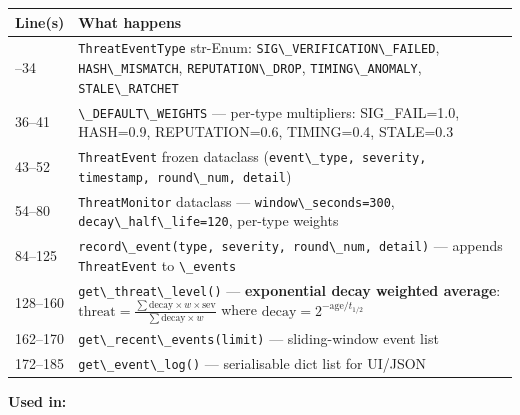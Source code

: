 \documentclass[11pt,a4paper]{article}
\newcommand{\code}[1]{\lstinline[basicstyle=\ttfamily\small]!#1!}
\begin{document}
\begin{longtable}{L{2.2cm} L{11.5cm}}
\toprule
\textbf{Line(s)} & \textbf{What happens} \\
\midrule
\endhead
\bottomrule
{}--34  & \code{ThreatEventType} str-Enum: \code{SIG\_VERIFICATION\_FAILED}, \code{HASH\_MISMATCH}, \code{REPUTATION\_DROP}, \code{TIMING\_ANOMALY}, \code{STALE\_RATCHET} \\
36--41  & \code{\_DEFAULT\_WEIGHTS} --- per-type multipliers: SIG\_FAIL=1.0, HASH=0.9, REPUTATION=0.6, TIMING=0.4, STALE=0.3 \\
43--52  & \code{ThreatEvent} frozen dataclass (\code{event\_type, severity, timestamp, round\_num, detail}) \\
54--80  & \code{ThreatMonitor} dataclass --- \code{window\_seconds=300}, \code{decay\_half\_life=120}, per-type weights \\
84--125 & \code{record\_event(type, severity, round\_num, detail)} --- appends \code{ThreatEvent} to \code{\_events} \\
128--160 & \code{get\_threat\_level()} --- \textbf{exponential decay weighted average}: $\text{threat} = \frac{\sum \text{decay} \times w \times \text{sev}}{\sum \text{decay} \times w}$ where $\text{decay} = 2^{-\text{age}/t_{1/2}}$ \\
162--170 & \code{get\_recent\_events(limit)} --- sliding-window event list \\
172--185 & \code{get\_event\_log()} --- serialisable dict list for UI/JSON \\
\end{longtable}

\textbf{Used in:}
\end{document}
